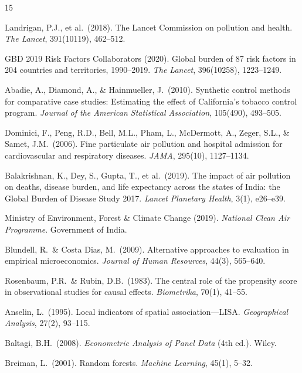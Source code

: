 \documentclass{article}
\begin{document}
\begin{thebibliography}{15}

Landrigan, P.J., et al.\ (2018).
The Lancet Commission on pollution and health.
\textit{The Lancet}, 391(10119), 462--512.

GBD 2019 Risk Factors Collaborators (2020).
Global burden of 87 risk factors in 204 countries and territories, 1990--2019.
\textit{The Lancet}, 396(10258), 1223--1249.

Abadie, A., Diamond, A., \& Hainmueller, J.\ (2010).
Synthetic control methods for comparative case studies: Estimating the effect of California's tobacco control program.
\textit{Journal of the American Statistical Association}, 105(490), 493--505.

Dominici, F., Peng, R.D., Bell, M.L., Pham, L., McDermott, A., Zeger, S.L., \& Samet, J.M.\ (2006).
Fine particulate air pollution and hospital admission for cardiovascular and respiratory diseases.
\textit{JAMA}, 295(10), 1127--1134.

Balakrishnan, K., Dey, S., Gupta, T., et al.\ (2019).
The impact of air pollution on deaths, disease burden, and life expectancy across the states of India: the Global Burden of Disease Study 2017.
\textit{Lancet Planetary Health}, 3(1), e26--e39.

Ministry of Environment, Forest \& Climate Change (2019).
\textit{National Clean Air Programme}.
Government of India.

Blundell, R.\ \& Costa Dias, M.\ (2009).
Alternative approaches to evaluation in empirical microeconomics.
\textit{Journal of Human Resources}, 44(3), 565--640.

Rosenbaum, P.R.\ \& Rubin, D.B.\ (1983).
The central role of the propensity score in observational studies for causal effects.
\textit{Biometrika}, 70(1), 41--55.

Anselin, L.\ (1995).
Local indicators of spatial association---LISA.
\textit{Geographical Analysis}, 27(2), 93--115.

Baltagi, B.H.\ (2008).
\textit{Econometric Analysis of Panel Data} (4th ed.).
Wiley.

Breiman, L.\ (2001).
Random forests.
\textit{Machine Learning}, 45(1), 5--32.


\end{thebibliography}
\end{document}
